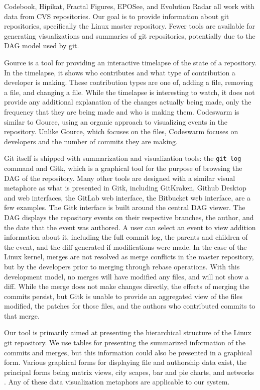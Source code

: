 Codebook, Hipikat, Fractal Figures, EPOSee, and Evolution Radar all work
with data from CVS repositories. Our goal is to provide information
about git repositories, specifically the Linux master repository. Fewer
tools are available for generating visualizations and summaries of git
repositories, potentially due to the DAG model used by git.

Gource is a tool for providing an interactive timelapse of the state of
a repository\cite{Caudwell2010}. In the timelapse, it shows who
contributes and what type of contribution a developer is making. These
contribution types are one of, adding a file, removing a file, and
changing a file. While the timelapse is interesting to watch, it does
not provide any additional explanation of the changes actually being
made, only the frequency that they are being made and who is making
them. Codeswarm\cite{ogawa09} is similar to Gource, using an organic approach to
visualizing events in the repository. Unlike Gource, which focuses on
the files, Codeswarm focuses on developers and the number of commits
they are making.

Git itself is shipped with summarization and visualization tools: the
\verb|git log| command and Gitk, which is a graphical tool for the
purpose of browsing the DAG of the repository. Many other tools are
designed with a similar visual metaphore as what is presented in Gitk,
including GitKraken, Github Desktop and web interfaces, the GitLab web
interface, the Bitbucket web interface, are a few examples. The Gitk
interface is built around the central DAG viewer. The DAG displays the
repository events on their respective branches, the author, and the date
that the event was authored. A user can select an event to view addition
information about it, including the full commit log, the parents and
children of the event, and the diff generated if modifications were
made. In the case of the Linux kernel, merges are not resolved as merge
conflicts in the master repository, but by the developers prior to
merging through rebase operations. With this development model, no
merges will have modified any files, and will not show a diff. While the
merge does not make changes directly, the effects of merging the commits
persist, but Gitk is unable to provide an aggregated view of the files
modified, the patches for those files, and the authors who contributed
commits to that merge.

Our tool is primarily aimed at presenting the hierarchical structure of
the Linux git repository. We use tables for presenting the summarized
information of the commits and merges, but this information could also
be presented in a graphical form. Various graphical forms for displaying
file and authorship data exist, the principal forms being matrix views,
city scapes, bar and pie charts, and networks \cite{Eick2002}. Any of
these data visualization metaphors are applicable to our system.

